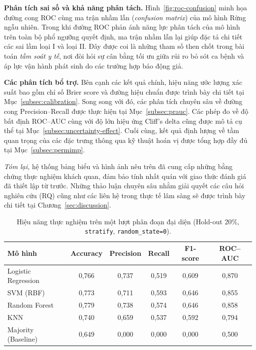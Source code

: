 \documentclass[14pt,a4paper]{extreport}
\begin{document}
\textbf{Phân tích sai số và khả năng phân tách.} Hình~\ref{fig:roc-confusion} minh họa đường cong ROC cùng ma trận nhầm lẫn (\textit{confusion matrix}) của mô hình Rừng ngẫu nhiên. Trong khi đường ROC phản ánh năng lực phân tách của mô hình trên toàn bộ phổ ngưỡng quyết định, ma trận nhầm lẫn lại giúp đặc tả chi tiết các sai lầm loại I và loại II. Đây được coi là những tham số then chốt trong bài toán \emph{tầm soát y tế}, nơi đòi hỏi sự cân bằng tối ưu giữa rủi ro bỏ sót ca bệnh và áp lực vận hành phát sinh do các trường hợp báo động giả.

\textbf{Các phân tích bổ trợ.} Bên cạnh các kết quả chính, hiệu năng ước lượng xác suất bao gồm chỉ số Brier score và đường hiệu chuẩn được trình bày chi tiết tại Mục~\ref{subsec:calibration}. Song song với đó, các phân tích chuyên sâu về đường cong Precision--Recall được thực hiện tại Mục~\ref{subsec:prauc}. Các phép đo về độ bất định ROC--AUC cùng với độ lớn hiệu ứng Cliff's delta cũng được mô tả cụ thể tại Mục~\ref{subsec:uncertainty-effect}. Cuối cùng, kết quả định lượng về tầm quan trọng của các đặc trưng thông qua kỹ thuật hoán vị được tổng hợp đầy đủ tại Mục~\ref{subsec:permimp}.

\noindent\textit{Tóm lại,} hệ thống bảng biểu và hình ảnh nêu trên đã cung cấp những bằng chứng thực nghiệm khách quan, đảm bảo tính nhất quán với giao thức đánh giá đã thiết lập từ trước. Những thảo luận chuyên sâu nhằm giải quyết các câu hỏi nghiên cứu (RQ) cũng như các liên hệ trong thực tế lâm sàng sẽ được trình bày chi tiết tại Chương~\ref{sec:discussion}.

\begin{table}[htbp]
  \centering
  \caption{Hiệu năng thực nghiệm trên một lượt phân đoạn đại diện (Hold-out 20\%, \texttt{stratify}, \texttt{random\_state=0}).}
  \label{tab:results-point}
  \begin{tabular}{lccccc}
    \toprule
    Mô hình & Accuracy & Precision & Recall & F1-score & ROC--AUC \\
    \midrule
    Logistic Regression & 0,766 & 0,737 & 0,519 & 0,609 & 0,870 \\
    SVM (RBF)             & 0,773 & 0,711 & 0,593 & 0,646 & 0,855 \\
    Random Forest         & 0,779 & 0,738 & 0,574 & 0,646 & 0,858 \\
    KNN                   & 0,740 & 0,659 & 0,537 & 0,592 & 0,794 \\
    Majority (Baseline)   & 0,649 & 0,000 & 0,000 & 0,000 & 0,500 \\
    \bottomrule
  \end{tabular}
\end{table}
\end{document}
